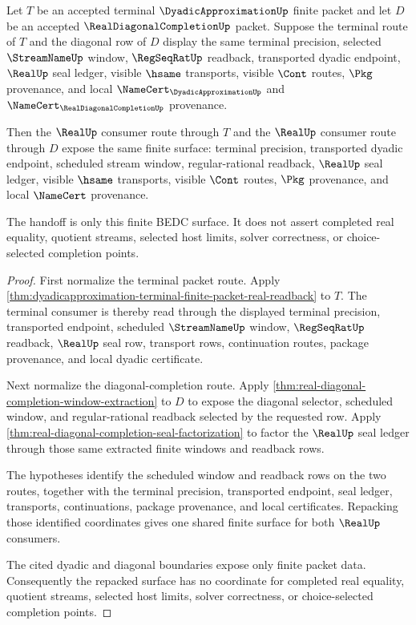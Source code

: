 \begin{theorem}
\label{thm:dyadicapproximation-terminal-diagonal-completion-handoff}
Let $T$ be an accepted terminal $\DyadicApproximationUp$ finite packet and
let $D$ be an accepted $\RealDiagonalCompletionUp$ packet. Suppose the
terminal route of $T$ and the diagonal row of $D$ display the same terminal
precision, selected $\StreamNameUp$ window, $\RegSeqRatUp$ readback,
transported dyadic endpoint, $\RealUp$ seal ledger, visible $\hsame$
transports, visible $\Cont$ routes, $\Pkg$ provenance, and local
$\NameCert_{\DyadicApproximationUp}$ and
$\NameCert_{\RealDiagonalCompletionUp}$ provenance.

Then the $\RealUp$ consumer route through $T$ and the $\RealUp$ consumer
route through $D$ expose the same finite surface: terminal precision,
transported dyadic endpoint, scheduled stream window, regular-rational
readback, $\RealUp$ seal ledger, visible $\hsame$ transports, visible
$\Cont$ routes, $\Pkg$ provenance, and local $\NameCert$ provenance.

The handoff is only this finite BEDC surface. It does not assert completed
real equality, quotient streams, selected host limits, solver correctness, or
choice-selected completion points.
\end{theorem}
\begin{proof}
First normalize the terminal packet route. Apply
\autoref{thm:dyadicapproximation-terminal-finite-packet-real-readback} to
$T$. The terminal consumer is thereby read through the displayed terminal
precision, transported endpoint, scheduled $\StreamNameUp$ window,
$\RegSeqRatUp$ readback, $\RealUp$ seal row, transport rows, continuation
routes, package provenance, and local dyadic certificate.

Next normalize the diagonal-completion route. Apply
\autoref{thm:real-diagonal-completion-window-extraction} to $D$ to expose the
diagonal selector, scheduled window, and regular-rational readback selected by
the requested row. Apply
\autoref{thm:real-diagonal-completion-seal-factorization} to factor the
$\RealUp$ seal ledger through those same extracted finite windows and
readback rows.

The hypotheses identify the scheduled window and readback rows on the two
routes, together with the terminal precision, transported endpoint, seal
ledger, transports, continuations, package provenance, and local
certificates. Repacking those identified coordinates gives one shared finite
surface for both $\RealUp$ consumers.

The cited dyadic and diagonal boundaries expose only finite packet data.
Consequently the repacked surface has no coordinate for completed real
equality, quotient streams, selected host limits, solver correctness, or
choice-selected completion points.
\end{proof}
